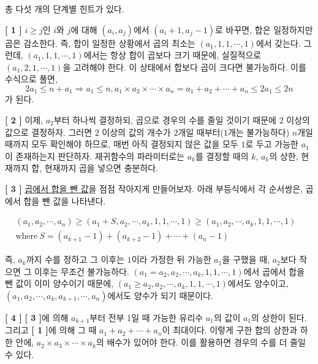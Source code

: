 \begin{hint}
    총 다섯 개의 단계별 힌트가 있다.

    \textbf{[ 1 ]} \newline
    $i \geq j$인 $i$와 $j$에 대해 $(a_i, a_j)$에서 $(a_i+1, a_j-1)$로 바꾸면, 합은 일정하지만 곱은 감소한다. 즉, 합이 일정한 상황에서 곱의 최소는 $(a_1, 1, 1, \cdots, 1)$에서 갖는다. 그런데, $(a_1, 1, 1, \cdots, 1)$에서는 항상 합이 곱보다 크기 때문에, 실질적으로 $(a_1, 2, 1, \cdots, 1)$을 고려해야 한다. 이 상태에서 합보다 곱이 크다면 불가능하다. 이를 수식으로 풀면,
    $$2a_1 \leq n + a_1 \Rightarrow a_1 \leq n, a_1 \times a_2 \times \cdots \times a_n = a_1 + a_2 + \cdots + a_n \leq 2a_1 \leq 2n$$
    가 된다.

    \textbf{[ 2 ]} \newline
    이제, $a_2$부터 하나씩 결정하되, 곱으로 경우의 수를 줄일 것이기 때문에 $2$ 이상의 값으로 결정하자. 그러면 $2$ 이상의 값의 개수가 $2$개일 때부터($1$개는 불가능하다) $n$개일 때까지 모두 확인해야 하므로, 매번 아직 결정되지 않은 값을 모두 $1$로 두고 가능한 $a_1$이 존재하는지 판단하자. 재귀함수의 파라미터로는 $a_k$를 결정할 때의 $k$, $a_k$의 상한, 현재까지 합, 현재까지 곱을 넣으면 충분하다.

    \textbf{[ 3 ]} \newline
    \underline{곱에서 합을 뺀 값}을 점점 작아지게 만들어보자. 아래 부등식에서 각 순서쌍은, 곱에서 합을 뺀 값을 나타낸다.
    
    \begin{align*}
        (a_1, a_2, \cdots, a_n) \geq (a_1 + S, a_2, \cdots, a_k, 1, 1, \cdots, 1) \geq (a_1, a_2, \cdots, a_k, 1, 1, \cdots, 1) & \\ \textrm{where}~S = (a_{k+1}-1) + (a_{k+2}-1) + \cdots + (a_n-1) &
    \end{align*}

    즉, $a_k$까지 수를 정하고 그 이후는 $1$이라 가정한 뒤 가능한 $a_1$을 구했을 때, $a_2$보다 작으면 그 이후는 무조건 불가능하다. $(a_1=a_2, a_2, \cdots, a_k, 1, 1, \cdots, 1)$에서 곱에서 합을 뺀 값이 이미 양수이기 때문에, $(a_1 \geq a_2, a_2, \cdots, a_k, 1, 1, \cdots, 1)$에서도 양수이고, $(a_1, a_2, \cdots, a_k, a_{k+1}, \cdots, a_n)$에서도 양수가 되기 때문이다.

    \textbf{[ 4 ]} \newline
    \textbf{[ 3 ]}에 의해 $a_{k+1}$부터 전부 1일 때 가능한 유리수 $a_1$의 값이 $a_1$의 상한이 된다. 그리고 \textbf{[ 1 ]}에 의해 그 때 $a_1 + a_2 + \cdots + a_n$이 최대이다. 이렇게 구한 합의 상한과 하한 안에, $a_2 \times a_3 \times \cdots \times a_k$의 배수가 있어야 한다. 이를 활용하면 경우의 수를 더 줄일 수 있다.


\end{hint}
